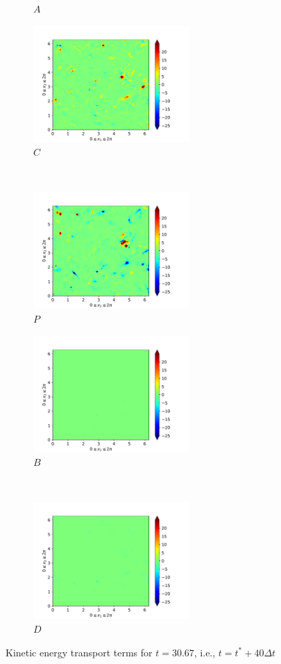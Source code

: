 \begin{figure}[H]
\begin{subfigure}{0.45\textwidth}
        \caption{$A$}
    \end{subfigure}
    \newline
    \begin{subfigure}{0.45\textwidth}
        \includegraphics[height=1.75in]{media/run-cds-65/C-ke-1380}
        \caption{$C$}
    \end{subfigure}
    ~
    \begin{subfigure}{0.45\textwidth}
        \includegraphics[height=1.75in]{media/run-cds-65/P-ke-1380}
        \caption{$P$}
    \end{subfigure}
    \newline
    \begin{subfigure}{0.45\textwidth}
        \includegraphics[height=1.75in]{media/run-cds-65/B-ke-1380}
        \caption{$B$}
    \end{subfigure}
    ~
    \begin{subfigure}{0.45\textwidth}
        \includegraphics[height=1.75in]{media/run-cds-65/D-ke-1380}
        \caption{$D$}
    \end{subfigure}
    \caption{Kinetic energy transport terms for $t=30.67$, i.e., $t=t^{\ast} + 40 \Delta t$}
\end{figure}
